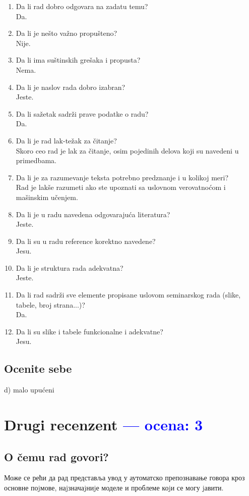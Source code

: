 \documentclass[a4paper]{report}
\newcommand{\odgovor}[1]{\textcolor{blue}{#1}}
\begin{document}
\begin{enumerate}
\item Da li rad dobro odgovara na zadatu temu?\\
Da.
\item Da li je nešto važno propušteno?\\
Nije.
\item Da li ima suštinskih grešaka i propusta?\\
Nema.
\item Da li je naslov rada dobro izabran?\\
Jeste.
\item Da li sažetak sadrži prave podatke o radu?\\
Da.
\item Da li je rad lak-težak za čitanje?\\
Skoro ceo rad je lak za čitanje, osim pojedinih delova koji su navedeni u primedbama.
\item Da li je za razumevanje teksta potrebno predznanje i u kolikoj meri?\\
Rad je lakše razumeti ako ste upoznati sa uslovnom verovatnoćom i mašinskim učenjem.
\item Da li je u radu navedena odgovarajuća literatura?\\
Jeste.
\item Da li su u radu reference korektno navedene?\\
Jesu.
\item Da li je struktura rada adekvatna?\\
Jeste.
\item Da li rad sadrži sve elemente propisane uslovom seminarskog rada (slike, tabele, broj strana...)?\\
Da.
\item Da li su slike i tabele funkcionalne i adekvatne?\\
Jesu.
\end{enumerate}

\section{Ocenite sebe}
 d) malo upućeni 



\chapter{Drugi recenzent \odgovor{--- ocena: 3} }
\section{O čemu rad govori?}
Може се рећи да рад представља увод у аутоматско препознавање говора кроз основне поjмове, наjзначаjниjе моделе и проблеме коjи се могу jавити.
\end{document}
